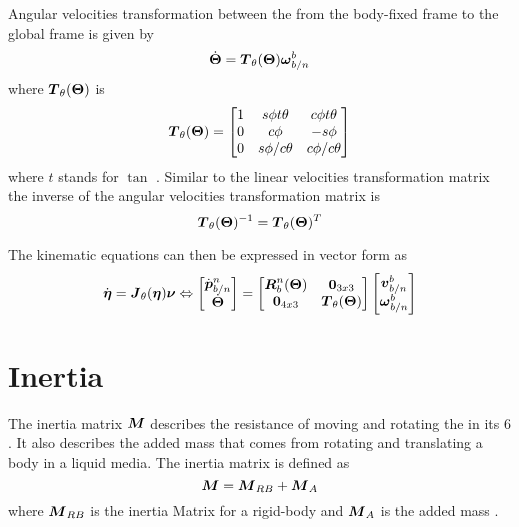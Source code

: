 Angular velocities transformation between the from the body-fixed frame to the global frame is given by 
\begin{equation}
\dot{\boldsymbol{\Theta}} = \boldsymbol{T}_{\theta}(\boldsymbol{\Theta})\boldsymbol{\omega}^b_{b/n}
\end{equation}
where $\boldsymbol{T}_{\theta}(\boldsymbol{\Theta})$ is 
\begin{equation}
\boldsymbol{T}_{\theta}(\boldsymbol{\Theta}) = \begin{bmatrix}
1 & s\phi t\theta & c\phi t\theta \\
0 & c\phi & -s\phi \\
0 & s\phi/c\theta & c\phi/c\theta
\end{bmatrix}
\end{equation}
where $t$ stands for $\tan$ \citep[24-25]{fossen2011}. Similar to the linear velocities transformation matrix the inverse of the angular velocities transformation matrix is
\begin{equation}
\boldsymbol{T}_{\theta}(\boldsymbol{\Theta})^{-1} = \boldsymbol{T}_{\theta}(\boldsymbol{\Theta})^T
\end{equation}

The kinematic equations can then be expressed in vector form as 
\begin{equation} \label{eq:kineticsEuler}
\dot{\boldsymbol{\eta}} = \boldsymbol{J}_\theta(\boldsymbol{\eta})\boldsymbol{\nu}
\Leftrightarrow
\begin{bmatrix}
\dot{\boldsymbol{p}}^n_{b/n} \\
\dot{\boldsymbol{\Theta}}
\end{bmatrix}
=
\begin{bmatrix}
\boldsymbol{R}^n_b(\boldsymbol{\Theta}) & \boldsymbol{0}_{3x3} \\
\boldsymbol{0}_{4x3} & \boldsymbol{T}_\theta(\boldsymbol{\Theta})
\end{bmatrix}
\begin{bmatrix}
\boldsymbol{v}^b_{b/n} \\
\boldsymbol{\omega}^b_{b/n}
\end{bmatrix}
\end{equation} 
\section{Inertia}
The inertia matrix $\boldsymbol{M}$ describes the resistance of moving and rotating the \abbrROV in its 6 \abbrDOF. It also describes the added mass that comes from rotating and translating a body in a liquid media. The inertia matrix is defined as
\begin{equation}
    \boldsymbol{M} = \boldsymbol{M}_{RB}+\boldsymbol{M}_{A}
\end{equation}
where $\boldsymbol{M}_{RB}$ is the inertia Matrix for a rigid-body and $\boldsymbol{M}_{A}$ is the added mass \citep{fossen2011}. 

